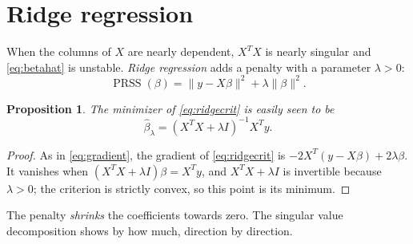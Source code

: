 \documentclass[11pt,oneside,openany]{book}
\newtheorem{proposition}[theorem]{Proposition}
\theoremstyle{definition}
\numberwithin{equation}{chapter}
\begin{document}
\section{Ridge regression}\label{sec:ridge}
When the columns of $X$ are nearly dependent, $X^TX$ is nearly singular and \eqref{eq:betahat} is unstable.
\emph{Ridge regression} \citep{hoerl1970} adds a penalty with a parameter $\lambda > 0$:
\begin{equation}\label{eq:ridgecrit}
\operatorname{PRSS}(\beta) = \|y - X\beta\|^2 + \lambda \|\beta\|^2 .
\end{equation}
\begin{proposition}\label{prop:ridge}
The minimizer of \eqref{eq:ridgecrit} is easily seen to be
\begin{equation}\label{eq:ridge}
\hat\beta_\lambda = (X^T X + \lambda I)^{-1} X^T y .
\end{equation}
\end{proposition}
\begin{proof}
As in \eqref{eq:gradient}, the gradient of \eqref{eq:ridgecrit} is $-2X^T(y - X\beta) + 2\lambda\beta$.
It vanishes when $(X^TX + \lambda I)\beta = X^T y$, and $X^T X + \lambda I$ is invertible because
$\lambda > 0$; the criterion is strictly convex, so this point is its minimum.
\end{proof}
The penalty \emph{shrinks} the coefficients towards zero. The singular value decomposition
shows by how much, direction by direction.
\end{document}

